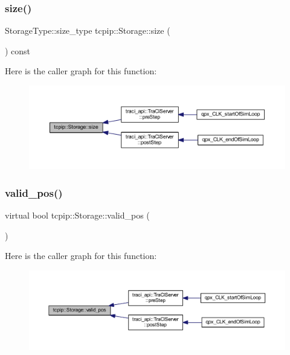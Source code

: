 \subsubsection{\texorpdfstring{size()}{size()}}
{\footnotesize\ttfamily Storage\+Type\+::size\+\_\+type tcpip\+::\+Storage\+::size (\begin{DoxyParamCaption}{ }\end{DoxyParamCaption}) const\hspace{0.3cm}{\ttfamily [inline]}}

Here is the caller graph for this function\+:\nopagebreak
\begin{figure}[H]
\begin{center}
\leavevmode
\includegraphics[width=350pt]{classtcpip_1_1_storage_a69f9705be09f7e5be1a29f4d145f451a_icgraph}
\end{center}
\end{figure}
\mbox{\label{classtcpip_1_1_storage_a90dbd2c479e5f06fca80783660ffc648}} 
\subsubsection{\texorpdfstring{valid\+\_\+pos()}{valid\_pos()}}
{\footnotesize\ttfamily virtual bool tcpip\+::\+Storage\+::valid\+\_\+pos (\begin{DoxyParamCaption}{ }\end{DoxyParamCaption})\hspace{0.3cm}{\ttfamily [virtual]}}

Here is the caller graph for this function\+:\nopagebreak
\begin{figure}[H]
\begin{center}
\leavevmode
\includegraphics[width=350pt]{classtcpip_1_1_storage_a90dbd2c479e5f06fca80783660ffc648_icgraph}
\end{center}
\end{figure}
\mbox{\label{classtcpip_1_1_storage_a5da17974ce811aefed71169685739073}} 
